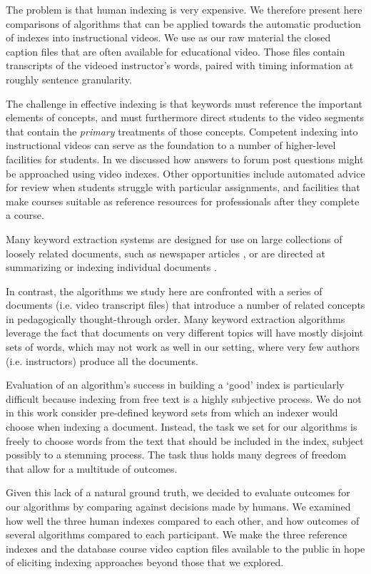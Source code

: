 The problem is that human indexing is very expensive. We therefore
present here comparisons of algorithms that can be applied towards the
automatic production of indexes into instructional videos. We use as
our raw material the closed caption files that are often available for
educational video. Those files contain transcripts of the videoed
instructor's words, paired with timing information at roughly sentence
granularity.

The challenge in effective indexing is that keywords must reference
the important elements of concepts, and must furthermore direct
students to the video segments that contain the {\em primary}
treatments of those concepts. Competent indexing into instructional
videos can serve as the foundation to a number of higher-level
facilities for students. In \cite{agrawal2015} we discussed how
answers to forum post questions might be approached using video
indexes. Other opportunities include automated advice for review when
students struggle with particular assignments, and facilities that
make courses suitable as reference resources for professionals after
they complete a course.

Many keyword extraction systems are designed for use on large
collections of loosely related documents, such as newspaper articles
\cite{Salton1975}, or are directed at summarizing or indexing
individual documents \cite{ohsawa1998}.

In contrast, the algorithms we study here are confronted with a series
of documents (i.e. video transcript files) that introduce a number of
related concepts in pedagogically thought-through order. Many keyword
extraction algorithms leverage the fact that documents on very
different topics will have mostly disjoint sets of words, which may
not work as well in our setting, where very few authors
(i.e. instructors) produce all the documents.

Evaluation of an algorithm's success in building a `good' index is
particularly difficult because indexing from free text is a highly
subjective process. We do not in this work consider pre-defined
keyword sets from which an indexer would choose when indexing a
document. Instead, the task we set for our algorithms is freely to
choose words from the text that should be included in the index,
subject possibly to a stemming process. The task thus holds many
degrees of freedom that allow for a multitude of outcomes.

Given this lack of a natural ground truth, we decided to evaluate
outcomes for our algorithms by comparing against decisions made by
humans. We examined how well the three human indexes compared to each
other, and how outcomes of several algorithms compared to each
participant. We make the three reference indexes and the database
course video caption files available to the public in hope of
eliciting indexing approaches beyond those that we explored.

